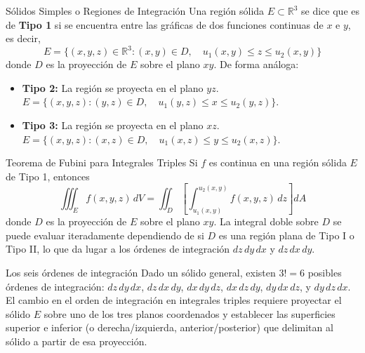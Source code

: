 \documentclass[11pt,a4paper]{article}
\begin{document}
\begin{definicionbox}{Sólidos Simples o Regiones de Integración}
Una región sólida $E \subset \mathbb{R}^3$ se dice que es de \textbf{Tipo 1} si se encuentra entre las gráficas de dos funciones continuas de $x$ e $y$, es decir,
\[ E = \{(x,y,z) \in \mathbb{R}^3 : (x,y) \in D, \quad u_1(x,y) \leq z \leq u_2(x,y)\} \]
donde $D$ es la proyección de $E$ sobre el plano $xy$. De forma análoga:
\begin{itemize}
    \item \textbf{Tipo 2:} La región se proyecta en el plano $yz$. $E = \{(x,y,z) : (y,z) \in D, \quad u_1(y,z) \leq x \leq u_2(y,z)\}$.
    \item \textbf{Tipo 3:} La región se proyecta en el plano $xz$. $E = \{(x,y,z) : (x,z) \in D, \quad u_1(x,z) \leq y \leq u_2(x,z)\}$.
\end{itemize}
\end{definicionbox}

\begin{teoremabox}{Teorema de Fubini para Integrales Triples}
Si $f$ es continua en una región sólida $E$ de Tipo 1, entonces
\[ \iiint_E f(x,y,z) \,dV = \iint_D \left[ \int_{u_1(x,y)}^{u_2(x,y)} f(x,y,z) \,dz \right] dA \]
donde $D$ es la proyección de $E$ sobre el plano $xy$. La integral doble sobre $D$ se puede evaluar iteradamente dependiendo de si $D$ es una región plana de Tipo I o Tipo II, lo que da lugar a los órdenes de integración $dz\,dy\,dx$ y $dz\,dx\,dy$.
\end{teoremabox}

\begin{observacionbox}{Los seis órdenes de integración}
Dado un sólido general, existen $3! = 6$ posibles órdenes de integración: $dz\,dy\,dx$, $dz\,dx\,dy$, $dx\,dy\,dz$, $dx\,dz\,dy$, $dy\,dx\,dz$, y $dy\,dz\,dx$. El cambio en el orden de integración en integrales triples requiere proyectar el sólido $E$ sobre uno de los tres planos coordenados y establecer las superficies superior e inferior (o derecha/izquierda, anterior/posterior) que delimitan al sólido a partir de esa proyección.
\end{observacionbox}
\end{document}
